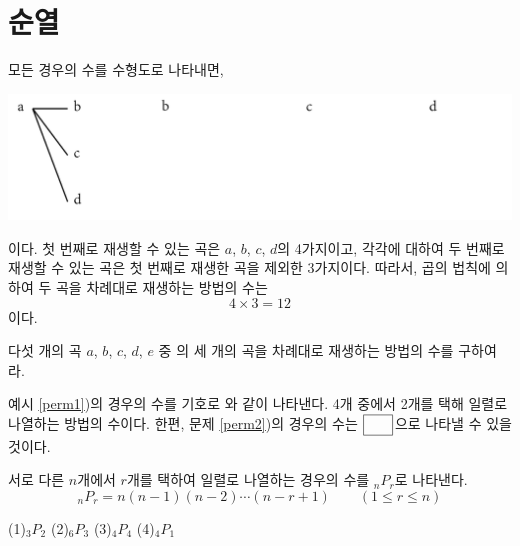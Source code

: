\documentclass{oblivoir}
\begin{document}
%
\label{law12}

%
\label{law13}

\section{순열}
%
\label{perm1}
\begin{mdframed}
모든 경우의 수를 수형도로 나타내면,
\begin{center}
\includegraphics[width=.9\textwidth]{perm_1}
\end{center}
이다.
첫 번째로 재생할 수 있는 곡은 \(a\), \(b\), \(c\), \(d\)의 4가지이고, 각각에 대하여 두 번째로 재생할 수 있는 곡은 첫  번째로 재생한 곡을 제외한 3가지이다.
따라서, 곱의 법칙에 의하여 두 곡을 차례대로 재생하는 방법의 수는
\[4\times3=12\]
이다.
\end{mdframed}

%
\prob{}\label{perm2}
다섯 개의 곡 \(a\), \(b\), \(c\), \(d\), \(e\) 중 의 세 개의 곡을 차례대로 재생하는 방법의 수를 구하여라.

\newpage
예시 \ref{perm1})의 경우의 수를 기호로 와 같이 나타낸다.
4개 중에서 2개를 택해 일렬로 나열하는 방법의 수이다.
한편, 문제 \ref{perm2})의 경우의 수는 \(\pb{_5P_3}\)으로 나타낼 수 있을 것이다.
\begin{mdframed}
%
\label{perm3}
\hspace{-.7em}
서로 다른 \(n\)개에서 \(r\)개를 택하여 일렬로 나열하는 경우의 수를 \(_nP_r\)로 나타낸다.
\[_nP_r=n(n-1)(n-2)\cdots(n-r+1)\qquad(1\le r\le n)\]
\end{mdframed}

%
\label{perm4}
(1)\;\;\(_3P_2\)\hspace{0.17\textwidth}
(2)\;\;\(_6P_3\)\hspace{0.17\textwidth}
(3)\;\;\(_4P_4\)\hspace{0.17\textwidth}
(4)\;\;\(_4P_1\)

%
\label{perm5}
\end{document}
